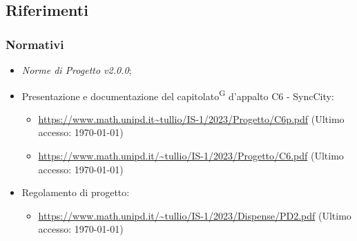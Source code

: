 \documentclass[8pt]{article}
\newcommand{\glossterm}[1]{#1\textsuperscript{G}} %
\begin{document}
\subsection{Riferimenti}
\subsubsection{Normativi}
\begin{itemize}
	\setlength\itemsep{0em}
	\item \textit{Norme di Progetto v2.0.0};
	\item Presentazione e documentazione del \glossterm{capitolato} d’appalto C6 - SyncCity:
	\begin{itemize}
	\setlength\itemsep{0em}
		\item \href{https://www.math.unipd.it/~tullio/IS-1/2023/Progetto/C6p.pdf}{\color{myblue}https://www.math.unipd.it\textasciitilde{}tullio/IS-1/2023/Progetto/C6p.pdf} (Ultimo accesso: \today)
		\item \href{https://www.math.unipd.it/~tullio/IS-1/2023/Progetto/C6.pdf}{\color{myblue}https://www.math.unipd.it/\textasciitilde{}tullio/IS-1/2023/Progetto/C6.pdf} (Ultimo accesso: \today)
	\end{itemize}
	\item Regolamento di progetto:
	\begin{itemize}
	\setlength\itemsep{0em}
		\item \href{https://www.math.unipd.it/~tullio/IS-1/2023/Dispense/PD2.pdf}{\color{myblue}https://www.math.unipd.it/\textasciitilde{}tullio/IS-1/2023/Dispense/PD2.pdf} (Ultimo accesso: \today)
	\end{itemize}
\end{itemize}
\clearpage
\end{document}
